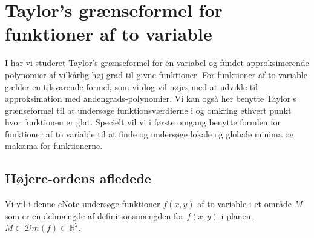 
\setcounter{chapter}{17} %



%
%
%
%
%
%

\chapter{Taylor's grænseformel for funktioner af to variable} \label{tn18}

\begin{basis}
 I  har vi studeret Taylor's grænseformel for én variabel og fundet approksimerende polynomier af vilkårlig høj grad til givne funktioner. For funktioner af to variable gælder en tilsvarende formel, som vi dog vil nøjes med at udvikle til approksimation med andengrads-polynomier. Vi kan også her benytte Taylor's grænseformel til at undersøge funktionsværdierne i og omkring ethvert punkt hvor funktionen er glat. Specielt vil vi i første omgang benytte formlen for funktioner af to variable til at finde og undersøge lokale og globale minima og maksima for funktionerne.
\end{basis}




\section{Højere-ordens afledede} \label{secTaylor2Var}
Vi vil i denne eNote undersøge funktioner $f(x, y)$ af to variable i et område $M$ som er en delmængde af definitionsmængden for $f(x,y)$ i planen, $M \subset \mathcal{D}m(f) \subset \mathbb{R}^{2}$.\\





